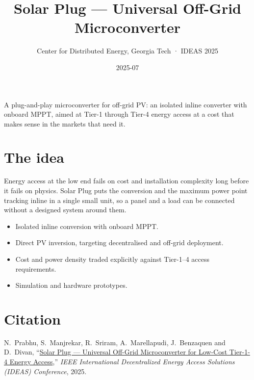 \title{Solar Plug --- Universal Off-Grid Microconverter}
\subtitle{Center for Distributed Energy, Georgia Tech · IDEAS 2025}
\date{2025-07}





A plug-and-play microconverter for off-grid PV: an isolated inline converter
with onboard MPPT, aimed at Tier-1 through Tier-4 energy access at a cost that
makes sense in the markets that need it.

\section{The idea}

Energy access at the low end fails on cost and installation complexity long
before it fails on physics. Solar Plug puts the conversion and the maximum power
point tracking inline in a single small unit, so a panel and a load can be
connected without a designed system around them.

\begin{itemize}
  \item Isolated inline conversion with onboard MPPT.
  \item Direct PV inversion, targeting decentralised and off-grid deployment.
  \item Cost and power density traded explicitly against Tier-1--4 access
        requirements.
  \item Simulation and hardware prototypes.
\end{itemize}

\section{Citation}

N.~Prabhu, S.~Manjrekar, R.~Sriram, A.~Marellapudi, J.~Benzaquen and D.~Divan,
``\href{https://doi.org/10.1109/IDEAS62193.2025.11157522}{Solar Plug ---
Universal Off-Grid Microconverter for Low-Cost Tier-1-4 Energy Access},''
\textit{IEEE International Decentralized Energy Access Solutions (IDEAS)
Conference}, 2025.


